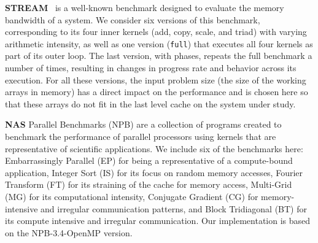 \textbf{STREAM}~\cite{McCalpin1995} is a well-known benchmark designed to
evaluate the memory bandwidth of a system. We consider six versions of this
benchmark, corresponding to its four inner kernels (add, copy, scale, and triad)
with varying arithmetic intensity, as well as one version (\texttt{full}) that
executes all four kernels as part of its outer loop. The last version, with phases,
repeats the full benchmark a number of times, resulting in changes in progress
rate and behavior across its execution. For all these versions, the input
problem size (the size of the working arrays in memory) has a direct impact on
the performance and is chosen here so that these arrays do not fit in the last
level cache on the system under study.
    
\textbf{NAS} Parallel Benchmarks (NPB) are a collection of programs
created to benchmark the performance of parallel processors using kernels that
are representative of scientific applications. 
We include six of the benchmarks here: Embarrassingly Parallel (EP) for being a
representative of a compute-bound application, Integer Sort (IS) for its focus
on random memory accesses, Fourier Transform (FT) for its straining of the cache for
memory access, Multi-Grid (MG) for its computational intensity, Conjugate
Gradient (CG) for memory-intensive and irregular communication patterns, and
Block Tridiagonal (BT) for its compute intensive and irregular communication.
Our implementation is based on the NPB-3.4-OpenMP version. 



